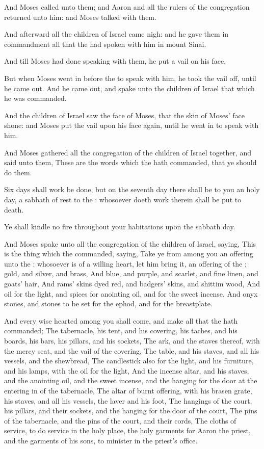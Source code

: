 \Verse And Moses called unto them; and Aaron and all the rulers of the congregation returned unto him: and Moses talked with them.

\Verse And afterward all the children of Israel came nigh: and he gave them in commandment all that the \LORD had spoken with him in mount Sinai.

\Verse And till Moses had done speaking with them, he put a vail on his face.

\Verse But when Moses went in before the \LORD to speak with him, he took the vail off, until he came out. And he came out, and spake unto the children of Israel that which he was commanded.

\Verse And the children of Israel saw the face of Moses, that the skin of Moses' face shone: and Moses put the vail upon his face again, until he went in to speak with him.

\Chapter
\Verse And Moses gathered all the congregation of the children of Israel together, and said unto them, These are the words which the \LORD hath commanded, that ye should do them.

\Verse Six days shall work be done, but on the seventh day there shall be to you an holy day, a sabbath of rest to the \LORD: whosoever doeth work therein shall be put to death.

\Verse Ye shall kindle no fire throughout your habitations upon the sabbath day.

\Verse And Moses spake unto all the congregation of the children of Israel, saying, This is the thing which the \LORD commanded, saying, \Verse Take ye from among you an offering unto the \LORD: whosoever is of a willing heart, let him bring it, an offering of the \LORD; gold, and silver, and brass, \Verse And blue, and purple, and scarlet, and fine linen, and goats' hair, \Verse And rams' skins dyed red, and badgers' skins, and shittim wood, \Verse And oil for the light, and spices for anointing oil, and for the sweet incense, \Verse And onyx stones, and stones to be set for the ephod, and for the breastplate.

\Verse And every wise hearted among you shall come, and make all that the \LORD hath commanded; \Verse The tabernacle, his tent, and his covering, his taches, and his boards, his bars, his pillars, and his sockets, \Verse The ark, and the staves thereof, with the mercy seat, and the vail of the covering, \Verse The table, and his staves, and all his vessels, and the shewbread, \Verse The candlestick also for the light, and his furniture, and his lamps, with the oil for the light, \Verse And the incense altar, and his staves, and the anointing oil, and the sweet incense, and the hanging for the door at the entering in of the tabernacle, \Verse The altar of burnt offering, with his brasen grate, his staves, and all his vessels, the laver and his foot, \Verse The hangings of the court, his pillars, and their sockets, and the hanging for the door of the court, \Verse The pins of the tabernacle, and the pins of the court, and their cords, \Verse The cloths of service, to do service in the holy place, the holy garments for Aaron the priest, and the garments of his sons, to minister in the priest's office.

